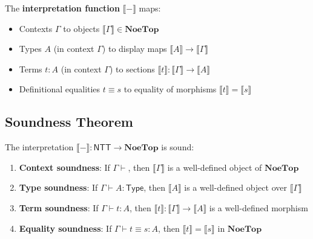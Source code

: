 \begin{definition}
\label{def:semantic-interpretation}
The \textbf{interpretation function} $\llbracket - \rrbracket$ maps:
\begin{itemize}
  \item Contexts $\Gamma$ to objects $\llbracket \Gamma \rrbracket \in \mathbf{NoeTop}$
  \item Types $A$ (in context $\Gamma$) to display maps $\llbracket A \rrbracket \to \llbracket \Gamma \rrbracket$
  \item Terms $t : A$ (in context $\Gamma$) to sections $\llbracket t \rrbracket : \llbracket \Gamma \rrbracket \to \llbracket A \rrbracket$
  \item Definitional equalities $t \equiv s$ to equality of morphisms $\llbracket t \rrbracket = \llbracket s \rrbracket$
\end{itemize}
\end{definition}

\subsection{Soundness Theorem}
\label{subsec:soundness-theorem}

\begin{theorem}
\label{thm:ntt-soundness}
The interpretation $\llbracket - \rrbracket : \mathsf{NTT} \to \mathbf{NoeTop}$ is sound:
\begin{enumerate}[label=(\alph*)]
  \item \textbf{Context soundness}: If $\Gamma \vdash$, then $\llbracket \Gamma \rrbracket$
        is a well-defined object of $\mathbf{NoeTop}$
  \item \textbf{Type soundness}: If $\Gamma \vdash A : \mathsf{Type}$, then
        $\llbracket A \rrbracket$ is a well-defined object over $\llbracket \Gamma \rrbracket$
  \item \textbf{Term soundness}: If $\Gamma \vdash t : A$, then
        $\llbracket t \rrbracket : \llbracket \Gamma \rrbracket \to \llbracket A \rrbracket$
        is a well-defined morphism
  \item \textbf{Equality soundness}: If $\Gamma \vdash t \equiv s : A$, then
        $\llbracket t \rrbracket = \llbracket s \rrbracket$ in $\mathbf{NoeTop}$
\end{enumerate}
\end{theorem}

